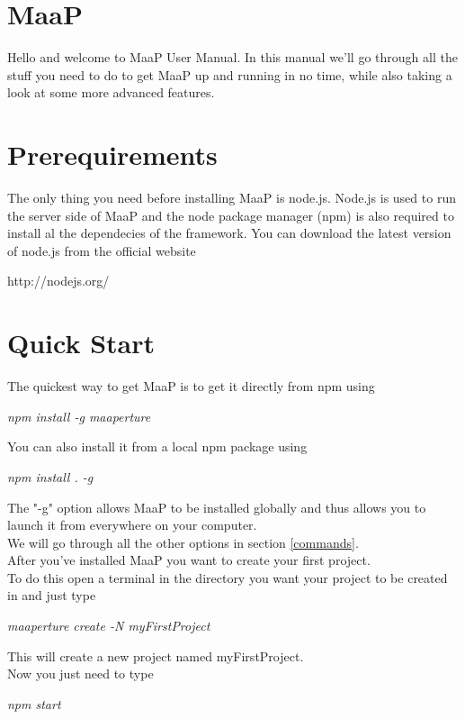 \newpage
\section{MaaP}
Hello and welcome to MaaP User Manual.
In this manual we'll go through all the stuff you need to do to get MaaP up and running in no time, while also taking a look at some more advanced features.

\section{Prerequirements}
The only thing you need before installing MaaP is node.js.
Node.js is used to run the server side of MaaP and the node package manager (npm) is also required to install al the dependecies of the framework.
You can download the latest version of node.js from the official website
\begin{center}
http://nodejs.org/
\end{center}


\section{Quick Start}
The quickest way to get MaaP is to get it directly from npm using
\begin{center}
\textit{npm install -g maaperture}
\end{center}

You can also install it from a local npm package using 
\begin{center}
\textit{npm install . -g}
\end{center}

The "-g" option allows MaaP to be installed globally and thus allows you to launch it from everywhere on your computer.\\
We will go through all the other options in section \ref{commands}.\\

After you've installed MaaP you want to create your first project.\\
To do this open a terminal in the directory you want your project to be created in and just type
\begin{center}
\textit{ maaperture create -N myFirstProject}
\end{center}

This will create a new project named myFirstProject.\\
Now you just need to type
\begin{center}
\textit{npm start}
\end{center}

